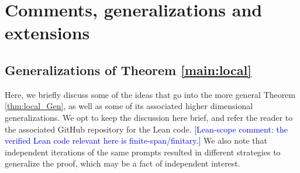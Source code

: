 \documentclass[11pt]{amsart}
\theoremstyle{remark}
\begin{document}
\section{Comments, generalizations and extensions}
\subsection{Generalizations of Theorem \ref{main:local}} Here, we briefly discuss some of the ideas that go into the more general Theorem \ref{thm:local_Gen}, as well as some of its associated higher dimensional generalizations. We opt to keep the discussion here brief, and refer the reader to the associated GitHub repository for the Lean code. \textcolor{blue}{[Lean-scope comment: the verified Lean code relevant here is finite-span/finitary.] } We also note that independent iterations of the same prompts resulted in different strategies to generalize the proof, which may be a fact of independent interest.
\end{document}
